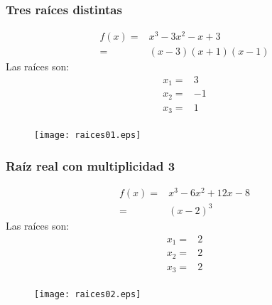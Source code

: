 \begin{frame}[fragile]
\frametitle{Tres raíces distintas}
\begin{minipage}{5cm}
\fontsize{12}{12}\selectfont
\[ \begin{split}
f(x)=& x^{3} - 3x^{2}-x+3 \\
=& (x-3)(x+1)(x-1)
\end{split} \]
Las raíces son:
\[ \begin{split}
x_{1} =& 3 \\
x_{2} =& -1 \\
x_{3} =& 1 \\
\end{split}\]
\end{minipage}
\hspace{0.5cm}
\begin{minipage}{4.5cm}
\begin{figure}
	\centering
	\texttt{[image: raices01.eps]} 
\end{figure}
\end{minipage}
\end{frame}
\begin{frame}[fragile]
\frametitle{Raíz real con multiplicidad 3}
\begin{minipage}{5cm}
\fontsize{12}{12}\selectfont
\[ \begin{split}
f(x)=& x^{3} - 6x^{2} + 12x - 8 \\
=& (x-2)^{3}
\end{split} \]
Las raíces son:
\[ \begin{split}
x_{1} =& 2 \\
x_{2} =& 2 \\
x_{3} =& 2 \\
\end{split}\]
\end{minipage}
\hspace{0.5cm}
\begin{minipage}{4.5cm}
\begin{figure}
	\centering
	\texttt{[image: raices02.eps]} 
\end{figure}
\end{minipage}
\end{frame}
